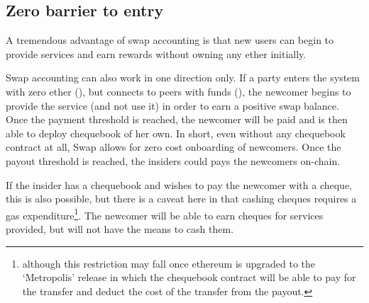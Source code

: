 
\subsection{Zero barrier to entry}

A tremendous advantage of swap accounting is that new users can begin to provide services and earn rewards without owning any ether initially.

Swap accounting can also work in one direction only. If a party enters the system with zero ether (), but connects to peers with funds (), the newcomer begins to provide the service (and not use it) in order to earn a positive swap balance. Once the payment threshold is reached, the newcomer will be paid and is then able to deploy chequebook of her own.
In short, even without any chequebook contract at all, Swap allows for zero cost onboarding of newcomers. Once the payout threshold is reached, the insiders could pays the newcomers on-chain. 

If the insider has a chequebook and wishes to pay the newcomer with a cheque, this is also possible, but there is a caveat here in that cashing cheques requires a gas expenditure\footnote{although this restriction may fall once ethereum is upgraded to the `Metropolis' release in which the chequebook contract will be able to pay for the transfer and deduct the cost of the transfer from the payout.}. The newcomer will be able to earn cheques for services provided, but will not have the means to cash them. 

